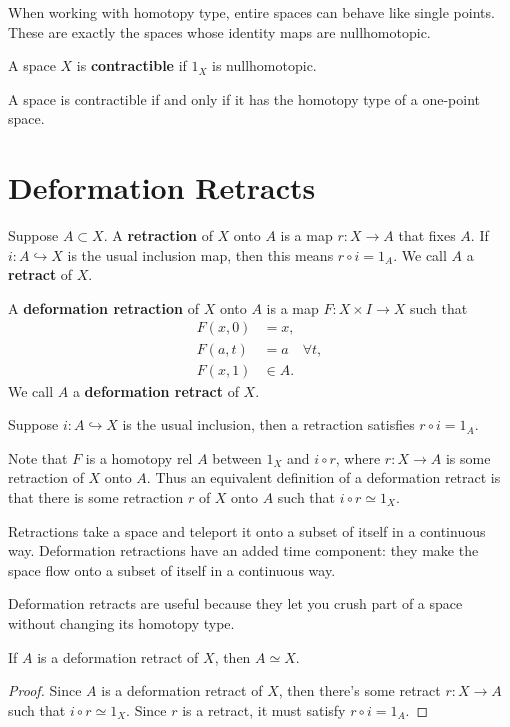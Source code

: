 \documentclass[twoside,10pt]{report}
\begin{document}
When working with homotopy type, entire spaces can behave like single points. These are exactly the spaces whose identity maps are nullhomotopic.

\begin{defn}[]
A space $X$ is \textbf{contractible} if $1_{X}$ is nullhomotopic.
\end{defn}

\begin{prop}
A space is contractible if and only if it has the homotopy type of a one-point space.
\end{prop}



\section{Deformation Retracts}

\begin{defn}[]
	Suppose $A \subset X$. A \textbf{retraction} of $X$ onto $A$ is a map $r:X\to A$ that fixes $A$. If $i:A\hookrightarrow X$ is the usual inclusion map, then this means $r\circ i = 1_{A}$. We call $A$ a \textbf{retract} of $X$.

	A \textbf{deformation retraction} of $X$ onto $A$ is a map $F:X\times I \to X$ such that
	\begin{align*}
		F(x,0)&=x,\\
		F(a,t)&=a \quad \forall t,\\
		F(x,1)&\in A.
	\end{align*}
	We call $A$ a \textbf{deformation retract} of $X$.
\end{defn}
Suppose $i:A\hookrightarrow X$ is the usual inclusion, then a retraction satisfies $r \circ i = 1_{A}$.

Note that $F$ is a homotopy rel $A$ between $1_{X}$ and $i \circ r$, where $r:X\to A$ is some retraction of $X$ onto $A$. Thus an equivalent definition of a deformation retract is that there is some retraction $r$ of $X$ onto $A$ such that $i \circ r \simeq 1_{X}$.

Retractions take a space and teleport it onto a subset of itself in a continuous way. Deformation retractions have an added time component: they make the space flow onto a subset of itself in a continuous way.

Deformation retracts are useful because they let you crush part of a space without changing its homotopy type.

\begin{prop}
	If $A$ is a deformation retract of $X$, then $A \simeq X$.
\end{prop}
\begin{proof}
	Since $A$ is a deformation retract of $X$, then there's some retract $r:X\to A$ such that $i \circ r \simeq 1_{X}$. Since $r$ is a retract, it must satisfy $r \circ i = 1_{A}$.
\end{proof}
\end{document}
